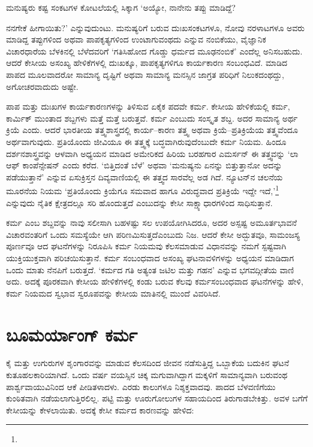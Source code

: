 {\parfillskip=0pt ಮನುಷ್ಯರು ಕಷ್ಟ ಸಂಕಟಗಳ ಕೋಟಲೆಯಲ್ಲಿ ಸಿಕ್ಕಾಗ ‘ಅಯ್ಯೋ, ನಾನೇನು ತಪ್ಪು ಮಾಡಿದ್ದೆ?\par}\newpage\noindent ನನಗೇಕೆ ಹೀಗಾಯಿತು?’ ಎನ್ನುವುದುಂಟು. ಮನುಷ್ಯರಿಗೆ ಬರುವ ದುಃಖಸಂಕಟಗಳೂ, ನೋವು ನರಳಾಟಗಳೂ ಅವರು ಮಾಡಿದ್ದ ತಪ್ಪುಗಳಿಂದ ಅಥವಾ ಪಾಪಕೃತ್ಯಗಳಿಂದ ಉಂಟಾಗುವಂಥದು ಎನ್ನುವ ನಂಬಿಕೆಯು, ವೈಜ್ಞಾನಿಕ ವಿಚಾರಧಾರೆಯ ಬೆಳಕಿನಲ್ಲಿ ಬೆಳೆದವರಿಗೆ ‘ಗತಿಸಿಹೋದ ಗೊಡ್ಡು ಧರ್ಮದ ಮೂಢನಂಬಿಕೆ’ ಎಂದೆಲ್ಲ ಅನಿಸಬಹುದು. ಆದರೆ ಕೇಸೀಯ ಅಸಂಖ್ಯ ಹೇಳಿಕೆಗಳಲ್ಲಿ ದುಃಖಕ್ಕೂ, ಪಾಪಕೃತ್ಯಗಳಿಗೂ ಕಾರ್ಯಕಾರಣ ಸಂಬಂಧವಿದೆ. ಮಾಡಿದ ಪಾಪದ ಮೂಲವಾದರೋ ಸಾಮಾನ್ಯ ದೃಷ್ಟಿಗೆ ಅಥವಾ ಸಾಮಾನ್ಯ ಮನಸ್ಸಿನ ಜಾಗ್ರತ ಪರಿಧಿಗೆ ನಿಲುಕ\-ದಂಥದ್ದು, ಅಗೋಚರವಾದುದು ಅಷ್ಟೇ.

ಪಾಪ ಮತ್ತು ದುಃಖಗಳ ಕಾರ್ಯಕಾರಣಗಳನ್ನು ತಿಳಿಸುವ ಏಕೈಕ ಪದವೇ ಕರ್ಮ. ಕೇಸೀಯ ಹೇಳಿಕೆಯಲ್ಲಿ ಕರ್ಮ, ಕಾರ್ಮಿಕ್  ಮುಂತಾದ ಶಬ್ದಗಳು ಮತ್ತೆ ಮತ್ತೆ ಬರುತ್ತವೆ. ಕರ್ಮ ಎಂಬುದು ಸಂಸ್ಕೃತ ಶಬ್ದ. ಅದರ ಸಾಮಾನ್ಯ ಅರ್ಥ ಕ್ರಿಯೆ ಎಂದು. ಆದರೆ ಭಾರತೀಯ ತತ್ತ್ವಶಾಸ್ತ್ರದಲ್ಲಿ ಕಾರ್ಯ–ಕಾರಣ ತತ್ತ್ವ ಅಥವಾ ಕ್ರಿಯೆ–ಪ್ರತಿಕ್ರಿಯೆಯ ತತ್ತ್ವವೆಂದೂ ಅರ್ಥವಾಗುವುದು. ಪ್ರತಿಯೊಂದು ಜೀವಿಯೂ ಈ ತತ್ತ್ವಕ್ಕೆ ಬದ್ಧವಾಗಿರುವುದೆಂಬುದೇ ಕರ್ಮ ನಿಯಮ. ಹಿಂದೂ ದರ್ಶನಶಾಸ್ತ್ರವನ್ನು ಆಳವಾಗಿ ಅಧ್ಯಯನ ಮಾಡಿದ ಅಮೇರಿಕದ ಹಿರಿಯ ಬರಹಗಾರ ಎಮರ್ಸನ್ ಈ ತತ್ತ್ವವನ್ನು ‘ಲಾ ಆಫ್ ಕಾಂಪೆನ್ಸೇಷನ್​ ಎಂದು ಕರೆದ. ‘ಬಿತ್ತಿದಂತೆ ಬೆಳೆ’ ಅಥವಾ ‘ಮನುಷ್ಯನು ಏನನ್ನು ಬಿತ್ತುತ್ತಾನೋ ಅದನ್ನು ಪಡೆಯುತ್ತಾನೆ’ ಎನ್ನುವ ಏಸುಕ್ರಿಸ್ತನ ದಿವ್ಯವಾಣಿಯಲ್ಲಿ ಈ ತತ್ತ್ವದ ಸಾರವೆಲ್ಲ ಅಡ ಗಿದೆ. ನ್ಯೂಟನ್​ನ ಚಲನೆಯ ಮೂರನೆಯ ನಿಯಮ ‘ಪ್ರತಿಯೊಂದು ಕ್ರಿಯೆಗೂ ಸಮವಾದ ಹಾಗೂ ವಿರುದ್ಧವಾದ ಪ್ರತಿಕ್ರಿಯೆ ಇದ್ದೇ ಇದೆ,’\footnote{} ಎನ್ನುವುದು ನೈತಿಕ ಕ್ಷೇತ್ರದಲ್ಲೂ ಸರಿ ಹೊಂದುತ್ತದೆ ಎಂಬುದನ್ನು ಕೇಸೀ ಸಾಕ್ಷ್ಯಾಧಾರಗಳಿಂದ ಸಾಧಿಸುತ್ತಾನೆ.

ಕರ್ಮ ಎಂಬ ಶಬ್ದವನ್ನು ನಾವು ಸಲೀಸಾಗಿ ಬಹಳಷ್ಟು ಸಲ ಉಪಯೋಗಿಸಿದರೂ, ಅದರ ಅಸ್ಪಷ್ಟ ಅಮೂರ್ತಭಾವನೆ ವಿಚಾರವಂತರಿಗೆ ಒಂದು ಸಮಸ್ಯೆಯೇ ಆಗಿ ಪರಿಣಮಿಸುತ್ತದೆ\break ಎಂಬುದು ನಿಜ. ಆದರೆ ಕೇಸೀ ಅದ್ಭುತವೂ, ಸಾಮಂಜಸ್ಯ ಪೂರ್ಣವೂ ಆದ ಘಟನೆಗಳನ್ನು ನಿರೂಪಿಸಿ ಕರ್ಮ ನಿಯಮವು ಕೆಲಸಮಾಡುವ ವಿಧಾನವನ್ನು ನಮಗೆ ಸ್ಪಷ್ಟವಾಗಿ ಯುಕ್ತಿಯುಕ್ತವಾಗಿ ಪರಿಚಯಿಸುತ್ತಾನೆ. ಕರ್ಮ ಸಂಬಂಧವಾದ ಅಸಂಖ್ಯ ಘಟನಾವಳಿಗಳನ್ನು ಅಧ್ಯಯನ ಮಾಡಿದಾಗ ಒಂದು ಮಾತು ನೆನಪಿಗೆ ಬರುತ್ತದೆ. ‘ಕರ್ಮದ ಗತಿ ಅತ್ಯಂತ ಜಟಿಲ ಮತ್ತು ಗಹನ’ ಎನ್ನುವ ಭಗವದ್ಗೀತೆಯ ವಾಣಿ ಅದು. ಅದಕ್ಕೆ ಪೂರಕವಾಗಿ ಕೇಸೀಯ ಹೇಳಿಕೆಗಳಲ್ಲಿ ಕಂಡು ಬರುವ ಕೆಲವು ಕರ್ಮಸಂಬಂಧವಾದ ಘಟನೆಗಳನ್ನು ಹೇಳಿ, ಕರ್ಮ ನಿಯಮದ ಸ್ವಭಾವ ಸ್ವರೂಪವನ್ನು ಕೇಸೀಯ ಮಾತಿನಲ್ಲಿ ಮುಂದೆ ವಿವರಿಸಿದೆ.


\section*{ಬೂಮರ್ಯಾಂಗ್ ಕರ್ಮ}

\vskip -6.5pt

ಕೈ ಮತ್ತು ಉಗುರುಗಳ ಶೃಂಗಾರವನ್ನು ಮಾಡುವ ಕೆಲಸದಿಂದ ಜೀವನ ನಡೆಸುತ್ತಿದ್ದ ಒಬ್ಬಾಕೆಯ ಬದುಕಿನ ಘಟನೆ ಕುತೂಹಲಕಾರಿಯಾಗಿದೆ. ಒಂದು ವರ್ಷ ವಯಸ್ಸಿನ ಚಿಕ್ಕ ಮಗುವಾಗಿದ್ದಾಗ ಮಕ್ಕಳಿಗೆ ಸಾಮಾನ್ಯವಾಗಿ ಬರುವಂಥ ಪಾರ್ಶ್ವವಾಯುವಿನಿಂದ ಆಕೆ ಪೀಡಿತಳಾದಳು. ಎರಡು ಕಾಲುಗಳೂ ನಿಶ್ಶಕ್ತವಾದವು. ಪಾದದ ಬೆಳವಣಿಗೆಯು ಕುಂಠಿತವಾಗಿ ನಡೆಯಲಾಗುತ್ತಿರಲಿಲ್ಲ. ಪಟ್ಟಿ ಮತ್ತು ಊರುಗೋಲುಗಳ ಸಹಾಯದಿಂದ ತಿರುಗಾಡಬೇಕಿತ್ತು. ಅವಳ ಬಗೆಗೆ ಕೇಸೀಯನ್ನು ಕೇಳಲಾಯಿತು. ಅದಕ್ಕೆ ಕೇಸೀ ಕರ್ಮದ ಕಾರಣವನ್ನು ಹೇಳಿದ:

